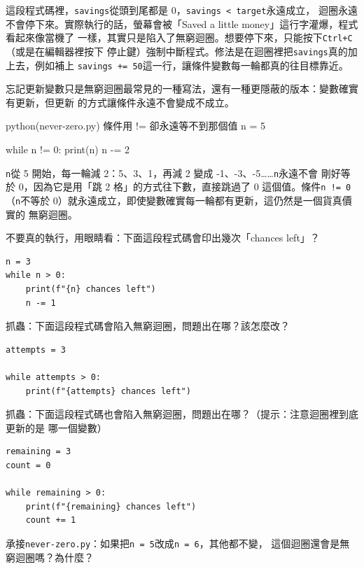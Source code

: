 這段程式碼裡，\texttt{savings}從頭到尾都是 0，\texttt{savings < target}永遠成立，
迴圈永遠不會停下來。實際執行的話，螢幕會被「Saved a little money」這行字灌爆，程式看起來像當機了
一樣，其實只是陷入了無窮迴圈。想要停下來，只能按下\texttt{Ctrl+C}（或是在編輯器裡按下
停止鍵）強制中斷程式。修法是在迴圈裡把\texttt{savings}真的加上去，例如補上
\texttt{savings += 50}這一行，讓條件變數每一輪都真的往目標靠近。


忘記更新變數只是無窮迴圈最常見的一種寫法，還有一種更隱蔽的版本：變數確實有更新，但更新
的方式讓條件永遠不會變成不成立。

\begin{example}{python}{(never-zero.py) 條件用 != 卻永遠等不到那個值}
n = 5

while n != 0:
    print(n)
    n -= 2
\end{example}

\texttt{n}從 5 開始，每一輪減 2：5、3、1，再減 2 變成 -1、-3、-5……\texttt{n}永遠不會
剛好等於 0，因為它是用「跳 2 格」的方式往下數，直接跳過了 0 這個值。條件\texttt{n != 0}
（\texttt{n}不等於 0）就永遠成立，即使變數確實每一輪都有更新，這仍然是一個貨真價實的
無窮迴圈。


\begin{drills}[label=drills:while-basics]
\item 不要真的執行，用眼睛看：下面這段程式碼會印出幾次「chances left」？
\begin{verbatim}
n = 3
while n > 0:
    print(f"{n} chances left")
    n -= 1
\end{verbatim}
\item 抓蟲：下面這段程式碼會陷入無窮迴圈，問題出在哪？該怎麼改？
\begin{verbatim}
attempts = 3

while attempts > 0:
    print(f"{attempts} chances left")
\end{verbatim}
\item 抓蟲：下面這段程式碼也會陷入無窮迴圈，問題出在哪？（提示：注意迴圈裡到底更新的是
哪一個變數）
\begin{verbatim}
remaining = 3
count = 0

while remaining > 0:
    print(f"{remaining} chances left")
    count += 1
\end{verbatim}
\item 承接\texttt{never-zero.py}：如果把\texttt{n = 5}改成\texttt{n = 6}，其他都不變，
這個迴圈還會是無窮迴圈嗎？為什麼？
\end{drills}

